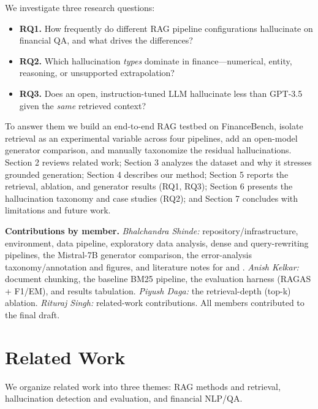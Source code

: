 \documentclass[11pt]{article}
\providecommand{\tightlist}{\setlength{\itemsep}{0pt}\setlength{\parskip}{0pt}}
\begin{document}
We investigate three research questions:

\begin{itemize}
\tightlist
\item
  \textbf{RQ1.} How frequently do different RAG pipeline configurations
  hallucinate on financial QA, and what drives the differences?
\item
  \textbf{RQ2.} Which hallucination \emph{types} dominate in
  finance---numerical, entity, reasoning, or unsupported extrapolation?
\item
  \textbf{RQ3.} Does an open, instruction-tuned LLM hallucinate less
  than GPT-3.5 given the \emph{same} retrieved context?
\end{itemize}

To answer them we build an end-to-end RAG testbed on FinanceBench,
isolate retrieval as an experimental variable across four pipelines, add
an open-model generator comparison, and manually taxonomize the residual
hallucinations. Section 2 reviews related work; Section 3 analyzes the
dataset and why it stresses grounded generation; Section 4 describes our
method; Section 5 reports the retrieval, ablation, and generator results
(RQ1, RQ3); Section 6 presents the hallucination taxonomy and case
studies (RQ2); and Section 7 concludes with limitations and future work.

\textbf{Contributions by member.} \emph{Bhalchandra Shinde:}
repository/infrastructure, environment, data pipeline, exploratory data
analysis, dense and query-rewriting pipelines, the Mistral-7B generator
comparison, the error-analysis taxonomy/annotation and figures, and
literature notes for \citet{lewis2020rag} and
\citet{islam2023financebench}. \emph{Anish Kelkar:} document chunking,
the baseline BM25 pipeline, the evaluation harness (RAGAS + F1/EM), and
results tabulation. \emph{Piyush Daga:} the retrieval-depth (top-k)
ablation. \emph{Rituraj Singh:} related-work contributions. All members
contributed to the final draft.

\hypertarget{related-work}{%
\section{Related Work}\label{related-work}}

We organize related work into three themes: RAG methods and retrieval,
hallucination detection and evaluation, and financial NLP/QA.
\end{document}
